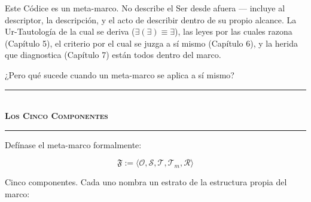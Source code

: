 \documentclass[10pt, openany, oneside]{book}
\renewcommand{\normalsize}{\fontsize{10}{13}\selectfont}
\begin{document}
Este Códice es un meta-marco. No describe el Ser desde afuera --- incluye al descriptor, la descripción, y el acto de describir dentro de su propio alcance. La Ur-Tautología de la cual se deriva ($\exists(\exists) \equiv \exists$), las leyes por las cuales razona (Capítulo 5), el criterio por el cual se juzga a sí mismo (Capítulo 6), y la herida que diagnostica (Capítulo 7) están todos dentro del marco.

¿Pero qué sucede cuando un meta-marco se aplica a sí mismo?

\vspace{1.5em}


\begin{center}
    \rule{0.3\textwidth}{0.4pt}\\[0.5em]
    {\normalsize\bfseries\scshape Los Cinco Componentes}\\[0.3em]
    \rule{0.3\textwidth}{0.4pt}
\end{center}

\vspace{1em}

\noindent Defínase el meta-marco formalmente:

$$\mathfrak{F} := \langle \mathcal{O}, \mathcal{S}, \mathcal{T}, \mathcal{T}_m, \mathcal{R} \rangle$$

Cinco componentes. Cada uno nombra un estrato de la estructura propia del marco:

\vspace{0.5em}
\end{document}
